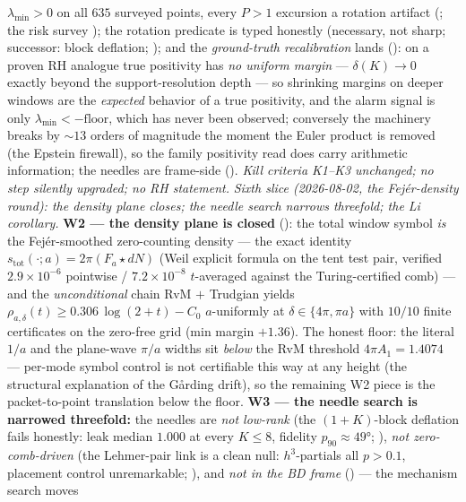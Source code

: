 $\lambda_{\min}>0$ on all $635$ surveyed points, every $P>1$
excursion a rotation artifact (; the
risk survey ); the rotation
predicate is typed honestly (necessary, not sharp; successor: block
deflation; ); and the
\emph{ground-truth recalibration} lands
(): on a proven RH analogue true
positivity has \emph{no uniform margin} --- $\delta(K)\to0$ exactly
beyond the support-resolution depth --- so shrinking margins on
deeper windows are the \emph{expected} behavior of a true
positivity, and the alarm signal is only
$\lambda_{\min}<-\mathrm{floor}$, which has never been observed;
conversely the machinery breaks by ${\sim}13$ orders of magnitude
the moment the Euler product is removed (the Epstein firewall), so
the family positivity read does carry arithmetic information; the
needles are frame-side ().  \emph{Kill
criteria K1--K3 unchanged; no step silently upgraded; no RH
statement.}
\emph{Sixth slice (2026-08-02, the Fej\'er-density round): the
density plane closes; the needle search narrows threefold; the Li
corollary.}  \textbf{W2 --- the density plane is closed}
(): the total window symbol \emph{is}
the Fej\'er-smoothed zero-counting density --- the exact identity
$s_{\mathrm{tot}}(\cdot;a)=2\pi(F_a\star dN)$ (Weil explicit formula
on the tent test pair, verified $2.9\times10^{-6}$ pointwise /
$7.2\times10^{-8}$ $t$-averaged against the Turing-certified comb)
--- and the \emph{unconditional} chain RvM $+$ Trudgian yields
$\rho_{a,\delta}(t)\ge0.306\,\log(2+t)-C_0$ $a$-uniformly at
$\delta\in\{4\pi,\pi a\}$ with $10/10$ finite certificates on the
zero-free grid (min margin $+1.36$).  The honest floor: the literal
$1/a$ and the plane-wave $\pi/a$ widths sit \emph{below} the RvM
threshold $4\pi A_1=1.4074$ --- per-mode symbol control is not
certifiable this way at any height (the structural explanation of
the G\aa rding drift), so the remaining W2 piece is the
packet-to-point translation below the floor.  \textbf{W3 --- the
needle search is narrowed threefold:} the needles are \emph{not
low-rank} (the $(1{+}K)$-block deflation fails honestly: leak median
$1.000$ at every $K\le8$, fidelity $p_{90}\approx49°$;
), \emph{not zero-comb-driven}
(the Lehmer-pair link is a clean null: $h^3$-partials all $p>0.1$,
placement control unremarkable;
), and \emph{not in the BD frame}
() --- the mechanism search moves
